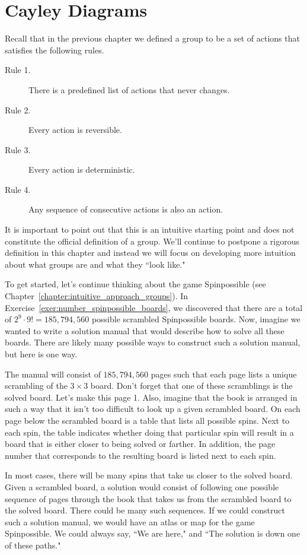 \chapter{Cayley Diagrams}
\label{chapter:cayley_diagrams}
\thispagestyle{empty}

Recall that in the previous chapter we defined a group to be a set of actions that satisfies the following rules.

\begin{description}
\item[Rule 1.] There is a predefined list of actions that never changes.
\item[Rule 2.] Every action is reversible.
\item[Rule 3.] Every action is deterministic.
\item[Rule 4.] Any sequence of consecutive actions is also an action.
\end{description}

It is important to point out that this is an intuitive starting point and does not constitute the official definition of a group.  We'll continue to postpone a rigorous definition in this chapter and instead we will focus on developing more intuition about what groups are and what they ``look like."  

To get started, let's continue thinking about the game Spinpossible (see Chapter~\ref{chapter:intuitive_approach_groups}).  In Exercise~\ref{exer:number_spinpossible_boards}, we discovered that there are a total of $2^9\cdot 9! = 185,794,560$ possible scrambled Spinpossible boards.  Now, imagine we wanted to write a solution manual that would describe how to solve all these boards.  There are likely many possible ways to construct such a solution manual, but here is one way.  

The manual will consist of $185,794,560$ pages such that each page lists a unique scrambling of the $3\times 3$ board.  Don't forget that one of these scramblings is the solved board.  Let's make this page 1.  Also, imagine that the book is arranged in such a way that it isn't too difficult to look up a given scrambled board.  On each page below the scrambled board is a table that lists all possible spins.  Next to each spin, the table indicates whether doing that particular spin will result in a board that is either closer to being solved or farther.  In addition, the page number that corresponds to the resulting board is listed next to each spin.

In most cases, there will be many spins that take us closer to the solved board.  Given a scrambled board, a solution would consist of following one possible sequence of pages through the book that takes us from the scrambled board to the solved board.  There could be many such sequences.  If we could construct such a solution manual, we would have an atlas or map for the game Spinpossible.  We could always say, ``We are here," and ``The solution is down one of these paths."

